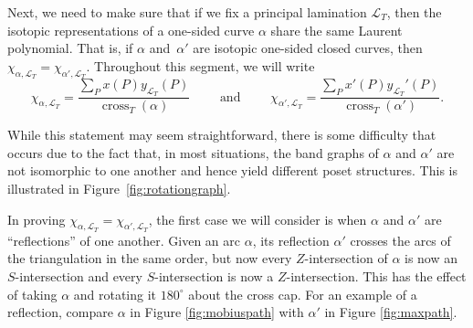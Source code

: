\documentclass[pdftex]{sigma}
\numberwithin{equation}{section}
\theoremstyle{definition}
\begin{document}
Next, we need to make sure that if we fix a principal lamination $\mathcal{L}_T$, then the isotopic representations of a one-sided curve $\alpha$ share the same Laurent polynomial. That is, if $\alpha$ and~$\alpha'$ are isotopic one-sided closed curves, then $\chi_{\alpha, \mathcal{L}_T}=\chi_{\alpha', \mathcal{L}_T}$. Throughout this segment, we will write \[\chi_{\alpha, \mathcal{L}_T}=\frac{\sum_P x(P)y_{\mathcal{L}_T}(P)}{\operatorname{cross}_T(\alpha)}\qquad \text{ and } \qquad \chi_{\alpha', \mathcal{L}_T}=\frac{\sum_{P} x'(P)y_{\mathcal{L}_T}'(P)}{\operatorname{cross}_T(\alpha')}.\]

While this statement may seem straightforward, there is some difficulty that occurs due to the fact that, in most situations, the band graphs of $\alpha$ and $\alpha'$ are not isomorphic to one another and hence yield different poset structures. This is illustrated in Figure~\ref{fig:rotationgraph}.

In proving $\chi_{\alpha, \mathcal{L}_T}=\chi_{\alpha', \mathcal{L}_T}$, the first case we will consider is when $\alpha$ and $\alpha'$ are ``reflections'' of one another. Given an arc $\alpha$, its reflection $\alpha'$ crosses the arcs of the triangulation in the same order, but now every $Z$-intersection of $\alpha$ is now an $S$-intersection and every $S$-intersection is now a $Z$-intersection. This has the effect of taking $\alpha$ and rotating it $180^{\circ}$ about the cross cap. For an example of a reflection, compare $\alpha$ in Figure \ref{fig:mobiuspath} with $\alpha'$ in Figure \ref{fig:maxpath}.
\end{document}

